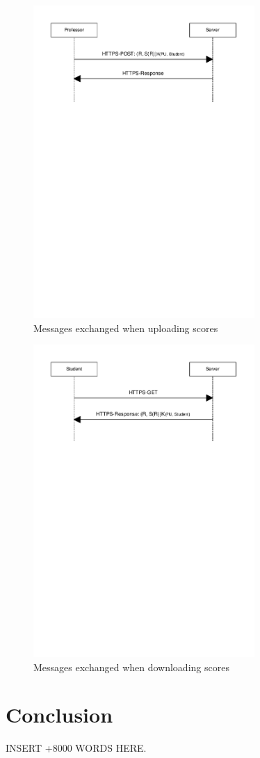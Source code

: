 \documentclass{article}
\begin{document}
\begin{figure}
\begin{center}
\includegraphics[width=0.75\textwidth]{images/upload_scores.pdf}
\caption{Messages exchanged when uploading scores}
\label{fig:upload-scores}
\end{center}
\end{figure}

\begin{figure}
\begin{center}
\includegraphics[width=0.75\textwidth]{images/download_scores.pdf}
\caption{Messages exchanged when downloading scores}
\label{fig:download-scores}
\end{center}
\end{figure}


\section{Conclusion}
\label{sec:conclusion}

INSERT +8000 WORDS HERE.
\end{document}
